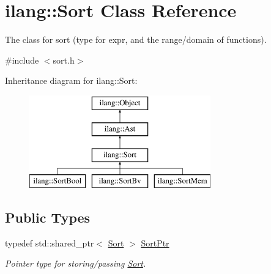 \hypertarget{classilang_1_1_sort}{}\section{ilang\+:\+:Sort Class Reference}
\label{classilang_1_1_sort}


The class for sort (type for expr, and the range/domain of functions).  




{\ttfamily \#include $<$sort.\+h$>$}

Inheritance diagram for ilang\+:\+:Sort\+:\begin{figure}[H]
\begin{center}
\leavevmode
\includegraphics[height=4.000000cm]{classilang_1_1_sort}
\end{center}
\end{figure}
\subsection*{Public Types}
\begin{DoxyCompactItemize}
\item 
\mbox{\label{classilang_1_1_sort_a8b9cc5e381404211a1c0423327866d3b}} 
typedef std\+::shared\+\_\+ptr$<$ \mbox{\hyperlink{classilang_1_1_sort}{Sort}} $>$ \mbox{\hyperlink{classilang_1_1_sort_a8b9cc5e381404211a1c0423327866d3b}{Sort\+Ptr}}
\begin{DoxyCompactList}\small\item\em Pointer type for storing/passing \mbox{\hyperlink{classilang_1_1_sort}{Sort}}. \end{DoxyCompactList}\end{DoxyCompactItemize}
